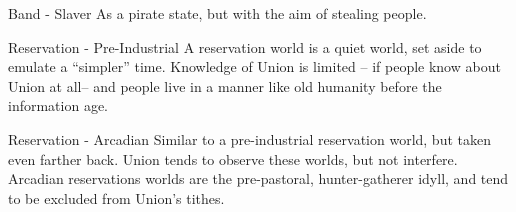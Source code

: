              Band  - Slaver                       As a pirate state, but with the aim of stealing people.  

             Reservation -  Pre-Industrial        A reservation world is a quiet world, set aside to  
                                                  emulate a “simpler” time. Knowledge of Union is  
                                                  limited -- if people know about Union at all--  and  
                                                  people live in a manner like old humanity before the  
                                                  information age.  

             Reservation - Arcadian               Similar to a pre-industrial reservation world, but taken  
                                                  even farther back. Union tends to observe these  
                                                  worlds, but not interfere. Arcadian reservations worlds  
                                                  are the pre-pastoral, hunter-gatherer idyll, and tend to  
                                                  be excluded from Union’s tithes.  
